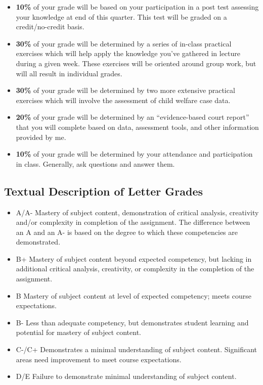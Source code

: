 \documentclass[11pt,]{article}
\providecommand{\tightlist}{%
  \setlength{\itemsep}{0pt}\setlength{\parskip}{0pt}}
\begin{document}
\begin{itemize}
\item
  \textbf{10\%} of your grade will be based on your participation in a
  post test assessing your knowledge at end of this quarter. This test
  will be graded on a credit/no-credit basis.
\item
  \textbf{30\%} of your grade will be determined by a series of in-class
  practical exercises which will help apply the knowledge you've
  gathered in lecture during a given week. These exercises will be
  oriented around group work, but will all result in individual grades.
\item
  \textbf{30\%} of your grade will be determined by two more extensive
  practical exercises which will involve the assessment of child welfare
  case data.
\item
  \textbf{20\%} of your grade will be determined by an ``evidence-based
  court report'' that you will complete based on data, assessment tools,
  and other information provided by me.
\item
  \textbf{10\%} of your grade will be determined by your attendance and
  participation in class. Generally, ask questions and answer them.
\end{itemize}

\subsection{Textual Description of Letter
Grades}\label{textual-description-of-letter-grades}

\begin{itemize}
\tightlist
\item
  A/A- Mastery of subject content, demonstration of critical analysis,
  creativity and/or complexity in completion of the assignment. The
  difference between an A and an A- is based on the degree to which
  these competencies are demonstrated.
\item
  B+ Mastery of subject content beyond expected competency, but lacking
  in additional critical analysis, creativity, or complexity in the
  completion of the assignment.
\item
  B Mastery of subject content at level of expected competency; meets
  course expectations.
\item
  B- Less than adequate competency, but demonstrates student learning
  and potential for mastery of subject content.
\item
  C-/C+ Demonstrates a minimal understanding of subject content.
  Significant areas need improvement to meet course expectations.
\item
  D/E Failure to demonstrate minimal understanding of subject content.
\end{itemize}
\end{document}
